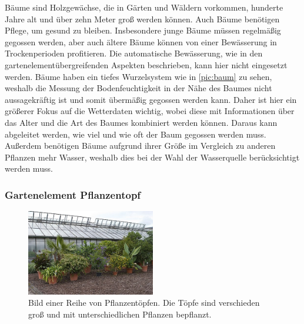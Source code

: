 
Bäume sind Holzgewächse, die in Gärten und Wäldern vorkommen, hunderte Jahre alt und über zehn Meter groß werden können.
Auch Bäume benötigen Pflege, um gesund zu bleiben.
Insbesondere junge Bäume müssen regelmäßig gegossen werden, aber auch ältere Bäume können von einer Bewässerung in Trockenperioden profitieren.
Die automatische Bewässerung, wie in den gartenelementübergreifenden Aspekten beschrieben, kann hier nicht eingesetzt werden.
Bäume haben ein tiefes Wurzelsystem wie in \cref{pic:baum} zu sehen, weshalb die Messung der Bodenfeuchtigkeit in der Nähe des Baumes nicht aussagekräftig ist und somit übermäßig gegossen werden kann.
Daher ist hier ein größerer Fokus auf die Wetterdaten wichtig, wobei diese mit Informationen über das Alter und die Art des Baumes kombiniert werden können.
Daraus kann abgeleitet werden, wie viel und wie oft der Baum gegossen werden muss.
Außerdem benötigen Bäume aufgrund ihrer Größe im Vergleich zu anderen Pflanzen mehr Wasser, weshalb dies bei der Wahl der Wasserquelle berücksichtigt werden muss.

\subsubsection{Gartenelement Pflanzentopf}
\begin{figure}[!htb]
	\centering
	\includegraphics[width=0.5\textwidth]{images/Topf.jpg}
	\caption[Bild einer Reihe von Pflanzentöpfen.]{
		Bild einer Reihe von Pflanzentöpfen.
		Die Töpfe sind verschieden groß und mit unterschiedlichen Pflanzen bepflanzt.\footnotemark
	}
	\label{pic:topf}
\end{figure}


